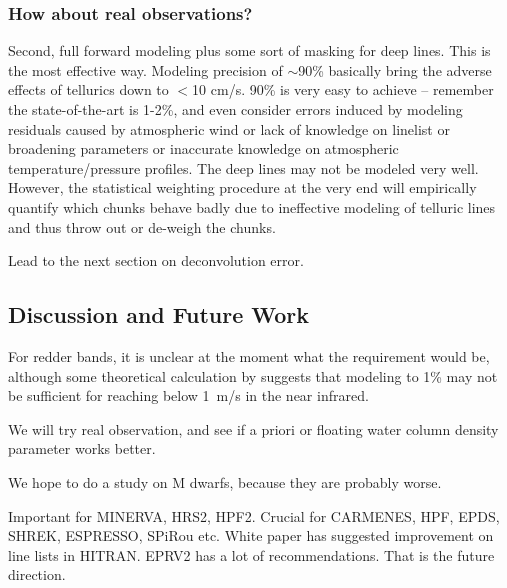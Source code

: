 \subsubsection{How about real observations?}

Second, full forward modeling plus some sort of masking for deep
lines. This is the most effective way. Modeling precision of
$\sim$90\% basically bring the adverse effects of tellurics down to
$<$10 cm/s. 90\% is very easy to achieve -- remember the
state-of-the-art is 1-2\%, and even consider errors induced by
modeling residuals caused by atmospheric wind or lack of knowledge on
linelist or broadening parameters or inaccurate knowledge on atmospheric
temperature/pressure profiles. The deep lines may not be modeled very
well. However, the statistical weighting procedure at the very end
will empirically quantify which chunks behave badly due to ineffective
modeling of telluric lines and thus throw out or de-weigh the chunks.

Lead to the next section on deconvolution error.


\subsection{Discussion and Future Work}\label{keck:telluric:future}


For redder bands, it is unclear at the moment what the requirement
would be, although some theoretical calculation by
\cite{2016AAS...22713719S} suggests that modeling to 1\% may not be
sufficient for reaching below 1~m/s in the near infrared.


We will try real observation, and see if a priori or floating water
column density parameter works better.

We hope to do a study on M dwarfs, because they are probably worse.

Important for MINERVA, HRS2, HPF2. Crucial for CARMENES, HPF, EPDS, SHREK,
ESPRESSO, SPiRou etc. White paper has suggested improvement on line
lists in HITRAN. EPRV2 has a lot of recommendations. That is the
future direction.

